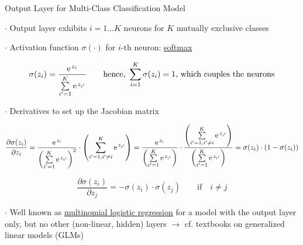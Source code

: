 \documentclass[mathserif, aspectratio=1610]{intbeamer}
\begin{document}
\begin{frame}[t]{Output Layer for Multi-Class Classification Model}

$\cdot$ Output layer exhibits $i=1 \dots K$ neurons for $K$ mutually exclusive classes

$\cdot$ Activation function $\sigma(\cdot)$ for $i\text{-th}$ neuron: \underline{softmax}

$$
\sigma(z_i) = \frac{\e^{z_i}}{\sum\limits_{i'=1}^{K} \e^{z_{i'}}} \qquad \text{hence, }\sum\limits_{i=1}^{K} \sigma(z_i) = 1
\text{, which couples the neurons}
$$

$\cdot$ Derivatives to set up the Jacobian matrix

$$\frac{\partial \sigma(z_i)}{\partial z_i} = \frac{\e^{z_i}}{\left(\sum\limits_{i'=1}^{K} \e^{z_{i'}}\right)^2} \cdot \left(\sum\limits_{i'=1, i' \neq i}^{K} \e^{z_{i'}}\right)=
\frac{\e^{z_i}}{\left(\sum\limits_{i'=1}^{K} \e^{z_{i'}}\right)} \cdot
\frac{\left(\sum\limits_{i'=1, i' \neq i}^{K} \e^{z_{i'}}\right)}{\left(\sum\limits_{i'=1}^{K} \e^{z_{i'}}\right)}=
\sigma(z_i) \cdot(1-\sigma(z_i))
$$

$$\frac{\partial \sigma(z_i)}{\partial z_j} = - \sigma(z_i) \cdot \sigma(z_j)\qquad \text{if} \quad i \neq j$$

$\cdot$ Well known as \underline{multinomial logistic regression} for a model with the output layer only, but no other (non-linear, hidden) layers $\rightarrow$ cf. textbooks on generalized linear models (GLMs)


\end{frame}
\end{document}
